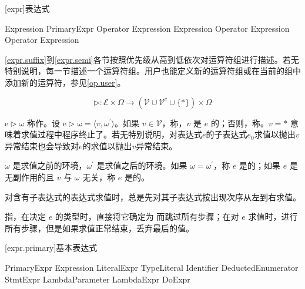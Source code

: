 
[expr]{表达式}

\begin{bnf}{Expression}
    PrimaryExpr \br
    Operator Expression \br
    Expression Operator \br
    Expression Operator Expression
\end{bnf}


\pnum
\ref{expr.suffix}到\ref{expr.semi}各节按照优先级从高到低依次对运算符组进行描述。若无特别说明，每一节描述一个运算符组。用户也能定义新的运算符组或在当前的组中添加新的运算符，参见\ref{op.user}。

$$ \mathrm{\rhd}: \mathcal{E} \times \Omega \rightarrow (\mathcal{V} \cup \mathcal{V}^\dag \cup \{\ast\}) \times \Omega $$

\pnum
$\mathrm{e \rhd \omega}$ 称作。设 $\mathrm{e \rhd \omega} = \langle v, \omega^\prime \rangle$。如果 $v \in \mathcal{V}$，称，$v$ 是 $e$ 的；否则，称。$v = \ast$ 意味着求值过程中程序终止了。若无特别说明，对表达式$e$的子表达式$e_0$求值以抛出$v$异常结束也会导致对$e$的求值以抛出$v$异常结束。

\pnum
$\omega$ 是求值之前的环境，$\omega^\prime$ 是求值之后的环境。如果 $\omega = \omega^\prime$，称 $e$ 是的；如果 $e$ 是无副作用的且 $v$ 与 $\omega$ 无关，称 $e$ 是的。

\pnum
对含有子表达式的表达式求值时，总是先对其子表达式按出现次序从左到右求值。

\pnum
{}指，在决定 $e$ 的类型时，直接将它确定为  而跳过所有步骤；在对 $e$ 求值时，进行所有步骤，但是如果求值正常结束，丢弃最后的值。

[expr.primary]{基本表达式}

\begin{bnf}{PrimaryExpr}
    \terminal{(} Expression \terminal{)} \br
    LiteralExpr \br
    TypeLiteral \br
    Identifier \br
    DeductedEnumerator \br
     \br
    \terminal{\$} \br
    StmtExpr \br
    LambdaParameter \br
    LambdaExpr \br
    DoExpr
\end{bnf}

